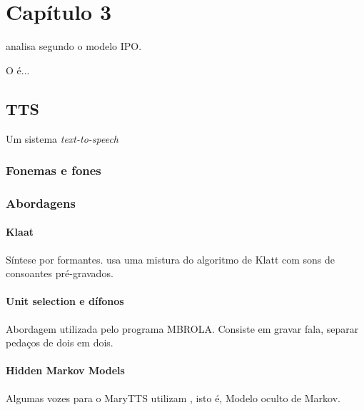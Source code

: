 
\chapter{Capítulo 3}


\cite{ipo} analisa segundo o modelo IPO.

O  é...


\section{TTS}
Um sistema \emph{text-to-speech}
\subsection{Fonemas e fones}
\subsection{Abordagens}
\subsubsection{Klaat}
Síntese por formantes. \cite{espeakng} usa uma mistura do algoritmo de Klatt com
sons de consoantes pré-gravados.
\subsubsection{Unit selection e dífonos}
Abordagem utilizada pelo programa MBROLA. Consiste em gravar fala, separar
pedaços de dois em dois.
\subsubsection{Hidden Markov Models}
Algumas vozes para o MaryTTS \cite{marytts} utilizam , isto é, Modelo oculto de Markov.
